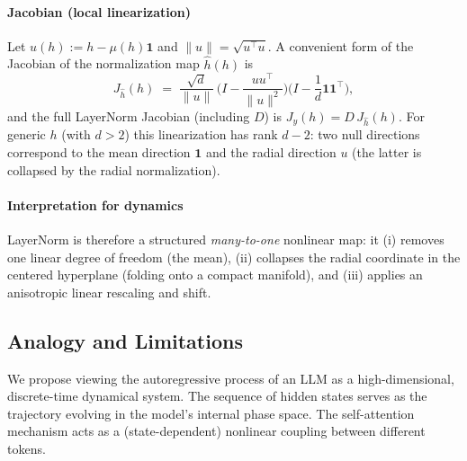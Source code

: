 \documentclass[a4paper,12pt]{article}
\begin{document}
\paragraph{Jacobian (local linearization)}
Let \(u(h):=h-\mu(h)\mathbf1\) and \(\|u\|=\sqrt{u^\top u}\).  A convenient form of the Jacobian of the normalization map \(\widehat{h}(h)\) is
\[
J_{\widehat{h}}(h)
\;=\;
\frac{\sqrt{d}}{\|u\|}\,\Big(I - \frac{u u^\top}{\|u\|^2}\Big)\Big(I - \frac{1}{d}\mathbf1\mathbf1^\top\Big),
\]
and the full LayerNorm Jacobian (including \(D\)) is \(J_y(h)=D\,J_{\widehat{h}}(h)\).  For generic \(h\) (with \(d>2\)) this linearization has rank \(d-2\): two null directions correspond to the mean direction \(\mathbf1\) and the radial direction \(u\) (the latter is collapsed by the radial normalization).

\paragraph{Interpretation for dynamics}
LayerNorm is therefore a structured \emph{many-to-one} nonlinear map: it (i) removes one linear degree of freedom (the mean), (ii) collapses the radial coordinate in the centered hyperplane (folding onto a compact manifold), and (iii) applies an anisotropic linear rescaling and shift.


\subsection{Analogy and Limitations}
We propose viewing the autoregressive process of an LLM as a high-dimensional, discrete-time dynamical system. The sequence of hidden states serves as the trajectory evolving in the model's internal phase space. The self-attention mechanism acts as a (state-dependent) nonlinear coupling between different tokens. 
\end{document}
